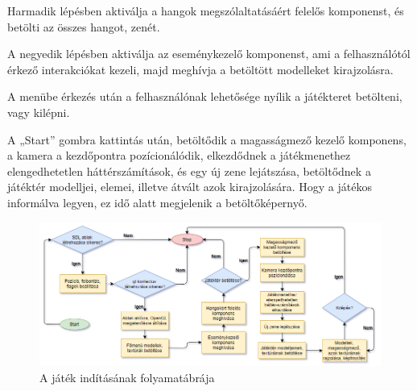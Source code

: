 Harmadik lépésben aktiválja a hangok megszólaltatásáért felelős komponenst, és betölti az összes hangot, zenét.

A negyedik lépésben aktiválja az eseménykezelő komponenst, ami a felhasználótól érkező interakciókat kezeli, majd meghívja a betöltött modelleket kirajzolásra.

A menübe érkezés után a felhasználónak lehetősége nyílik a játékteret betölteni, vagy kilépni. 

A „Start” gombra kattintás után, betöltődik a magasságmező kezelő komponens, a kamera a kezdőpontra pozícionálódik, elkezdődnek a játékmenethez elengedhetetlen háttérszámítások, és egy új zene lejátszása, betöltődnek a játéktér modelljei, elemei, illetve átvált azok kirajzolására. Hogy a játékos informálva legyen, ez idő alatt megjelenik a betöltőképernyő.

\begin{figure}[h]
\centering
\includegraphics[scale=0.46]{kepek/starting_diagram.png}
\caption{A játék indításának folyamatábrája}
\label{fig:starting}
\end{figure}

